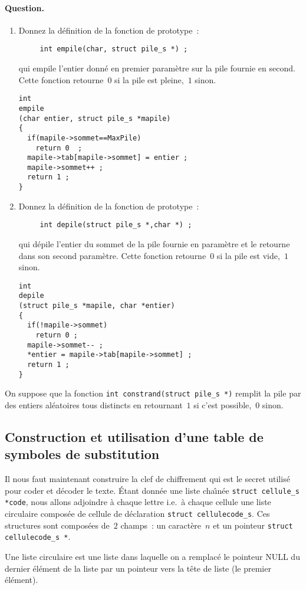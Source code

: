 \paragraph{Question.}
\begin{enumerate}
\item Donnez la d\'efinition de la fonction de prototype~:
\begin{verbatim}
     int empile(char, struct pile_s *) ;
\end{verbatim}
  qui empile l'entier donn\'e en premier param\`etre sur la pile
  fournie en second. Cette fonction retourne~$0$ si la pile est
  pleine,~$1$ sinon.
\ifcorrection
  \begin{correction}
\begin{verbatim}
int
empile
(char entier, struct pile_s *mapile)
{
  if(mapile->sommet==MaxPile)
    return 0  ;
  mapile->tab[mapile->sommet] = entier ;
  mapile->sommet++ ;
  return 1 ;
}
\end{verbatim}
  \end{correction}
\fi
\item Donnez la d\'efinition de la fonction de prototype~:
\begin{verbatim}
     int depile(struct pile_s *,char *) ;
\end{verbatim}
  qui d\'epile l'entier du sommet de la pile fournie en param\`etre et
  le retourne dans son second param\`etre. Cette fonction retourne~$0$
  si la pile est vide,~$1$ sinon.
\ifcorrection
  \begin{correction}
\begin{verbatim}
int 
depile
(struct pile_s *mapile, char *entier)
{
  if(!mapile->sommet)
    return 0 ;
  mapile->sommet-- ;
  *entier = mapile->tab[mapile->sommet] ;
  return 1 ;
}
\end{verbatim}
  \end{correction}
\fi
\end{enumerate}
On suppose que la fonction \verb+int constrand(struct pile_s *)+ remplit
la pile par des entiers al\'eatoires tous distincts en retournant~$1$
si c'est possible,~$0$ sinon.
\subsection{Construction et utilisation d'une table de symboles de substitution}
\label{sec:codesub}
Il nous faut maintenant construire la clef de chiffrement qui est le
secret utilis\'e pour coder et d\'ecoder le texte. \'Etant donn\'ee
une liste cha\^\i{}n\'ee \verb+struct cellule_s *code+, nous allons
adjoindre \`a chaque lettre i.e.\ \`a chaque cellule une liste
circulaire compos\'ee de cellule de d\'eclaration %
\verb+struct cellulecode_s+. Ces structures sont compos\'ees de~$2$
champs~: un caract\`ere~$n$ et un pointeur %
\verb+struct cellulecode_s *+.
\par
Une liste circulaire est une liste dans laquelle on a remplac\'e le
pointeur NULL du dernier \'el\'ement de la liste par un pointeur vers
la t\^ete de liste (le premier \'el\'ement).
